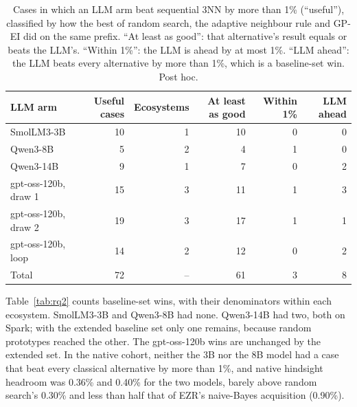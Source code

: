 \begin{table}[t]
\centering
\caption{Cases in which an LLM arm beat sequential 3NN by more than 1\% (``useful''), classified by how the best of random search, the adaptive neighbour rule and GP-EI did on the same prefix. ``At least as good'': that alternative's result equals or beats the LLM's. ``Within 1\%'': the LLM is ahead by at most 1\%. ``LLM ahead'': the LLM beats every alternative by more than 1\%, which is a baseline-set win. Post hoc.}
\label{tab:match}
\small
\begin{tabular}{lrrrrr}
\toprule
LLM arm & Useful cases & Ecosystems & At least as good & Within 1\% & LLM ahead \\
\midrule
SmolLM3-3B & 10 & 1 & 10 & 0 & 0 \\
Qwen3-8B & 5 & 2 & 4 & 1 & 0 \\
Qwen3-14B & 9 & 1 & 7 & 0 & 2 \\
gpt-oss-120b, draw 1 & 15 & 3 & 11 & 1 & 3 \\
gpt-oss-120b, draw 2 & 19 & 3 & 17 & 1 & 1 \\
gpt-oss-120b, loop & 14 & 2 & 12 & 0 & 2 \\
\midrule
Total & 72 & -- & 61 & 3 & 8 \\
\bottomrule
\end{tabular}
\end{table}

Table~\ref{tab:rq2} counts baseline-set wins, with their denominators within each ecosystem. SmolLM3-3B and Qwen3-8B had none. Qwen3-14B had two, both on Spark; with the extended baseline set only one remains, because random prototypes reached the other. The gpt-oss-120b wins are unchanged by the extended set. In the native cohort, neither the 3B nor the 8B model had a case that beat every classical alternative by more than 1\%, and native hindsight headroom was 0.36\% and 0.40\% for the two models, barely above random search's 0.30\% and less than half that of EZR's naive-Bayes acquisition (0.90\%).

